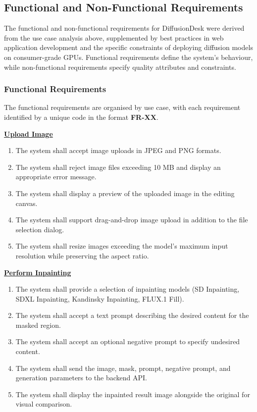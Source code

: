\documentclass[12pt,a4paper]{report}
\begin{document}
\subsection{Functional and Non-Functional Requirements}

The functional and non-functional requirements for DiffusionDesk were derived from the use case analysis above, supplemented by best practices in web application development and the specific constraints of deploying diffusion models on consumer-grade GPUs. Functional requirements define the system's behaviour, while non-functional requirements specify quality attributes and constraints.

\subsubsection{Functional Requirements}

The functional requirements are organised by use case, with each requirement identified by a unique code in the format \textbf{FR-XX}.

\vspace{0.5em}
\noindent\underline{\textbf{Upload Image}}

\begin{enumerate}[label=\textbf{FR-\arabic*}.,start=1]
    \item The system shall accept image uploads in JPEG and PNG formats.
    \item The system shall reject image files exceeding 10 MB and display an appropriate error message.
    \item The system shall display a preview of the uploaded image in the editing canvas.
    \item The system shall support drag-and-drop image upload in addition to the file selection dialog.
    \item The system shall resize images exceeding the model's maximum input resolution while preserving the aspect ratio.
\end{enumerate}

\vspace{0.5em}
\noindent\underline{\textbf{Perform Inpainting}}

\begin{enumerate}[label=\textbf{FR-\arabic*}.,start=6]
    \item The system shall provide a selection of inpainting models (SD Inpainting, SDXL Inpainting, Kandinsky Inpainting, FLUX.1 Fill).
    \item The system shall accept a text prompt describing the desired content for the masked region.
    \item The system shall accept an optional negative prompt to specify undesired content.
    \item The system shall send the image, mask, prompt, negative prompt, and generation parameters to the backend API.
    \item The system shall display the inpainted result image alongside the original for visual comparison.
\end{enumerate}
\end{document}
